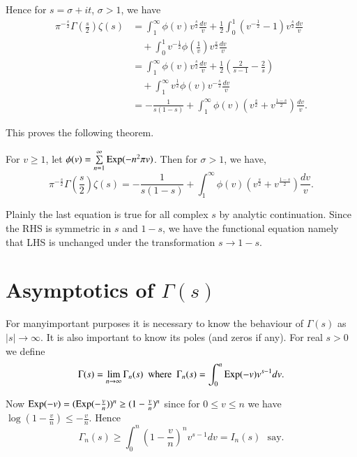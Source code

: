 Hence for $s=\sigma+it$, $\sigma>1$, we have
\begin{align*}
\pi^{-\frac{s}{2}}\Gamma \left(\frac{s}{2} \right)\zeta(s) &=
\int^{\infty}_{1}\phi(v)v^{\frac{s}{2}}\frac{dv}{v}+\frac{1}{2}\int^{1}_{0}(v^{-\frac{1}{2}}-1)v^{\frac{s}{2}}\frac{dv}{v}\\
&\quad
+\int^{1}_{0}v^{-\frac{1}{2}}\phi \left(\frac{1}{v} \right)v^{\frac{s}{2}}\frac{dv}{v}\\
&=
\int^{\infty}_{1}\phi(v)v^{\frac{s}{2}}\frac{dv}{v}+\frac{1}{2}\left(\frac{2}{s-1}-\frac{2}{s}\right)\\ 
&\quad
+\int^{\infty}_{1}v^{\frac{1}{2}}\phi(v)v^{-\frac{s}{2}}\frac{dv}{v}\\
&=
-\frac{1}{s(1-s)}+\int^{\infty}_{1}\phi(v)\left(v^{\frac{s}{2}}+v^{\frac{1-s}{2}}\right)\frac{dv}{v}.  
\end{align*}

This proves the following theorem.

\begin{theorem}\label{c7:thm7.3.1}
For $v\geq 1$, let $\phi(v)=\sum\limits^{\infty}_{n=1}\operatorname{Exp}(-n^{2}\pi
v)$. Then for $\sigma>1$, we have,
\begin{equation*}
\pi^{-\frac{s}{2}}\Gamma\left(\frac{s}{2}\right)\zeta(s) =
-\frac{1}{s(1-s)}+\int^{\infty}_{1}\phi(v)
\left(v^{\frac{s}{2}}+v^{\frac{1-s}{2}}\right)\frac{dv}{v}.\tag{7.3.3}\label{c7:eq7.3.3} 
\end{equation*}

Plainly the last equation is true for all complex $s$ by analytic
continuation. Since the RHS is symmetric in $s$ and $1-s$, we have the
functional equation namely that LHS is unchanged under the
transformation $s\to 1-s$.
\end{theorem}

\section{Asymptotics of $\Gamma(s)$}\label{c7:sec7.4}

For many\pageoriginale important purposes it is necessary to know the behaviour of
$\Gamma(s)$ as $|s|\to \infty$. It is also important to know its poles
(and zeros if any). For real $s>0$ we define
$$ 
\Gamma(s)=\lim\limits_{n\to \infty}\Gamma_{n}(s)\text{~ where~ }
\Gamma_{n}(s)=\int^{n}_{0}\operatorname{Exp}(-v)v^{s-1}dv. 
$$

Now $\operatorname{Exp}(-v)=(\operatorname{Exp}(-\frac{v}{n}))^{n}\geq (1-\frac{v}{n})^{n}$ since
for $0\leq v\leq n$ we have $\log(1-\frac{v}{n})\leq
-\frac{v}{n}$. Hence
$$
\Gamma_{n}(s)\geq
\int^{n}_{0}\left(1-\frac{v}{n}\right)^{n}v^{s-1}dv=I_{n}(s)\text{~ say.}
$$

